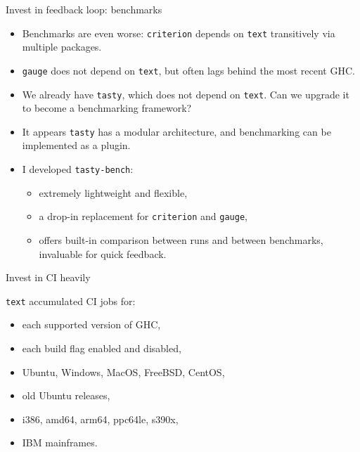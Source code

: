 \documentclass[handout]{beamer}
\begin{document}
\begin{frame}{Invest in feedback loop: benchmarks}

\begin{itemize}[<+->]
\item Benchmarks are even worse: {\tt criterion} depends on {\tt text}
      transitively via multiple packages.
\item {\tt gauge} does not depend on {\tt text}, but often lags behind
      the most recent GHC.
\item We already have {\tt tasty}, which does not depend on {\tt text}.
      Can we upgrade it
      to become a benchmarking framework?
\item It appears {\tt tasty} has a modular architecture,
      and benchmarking can be implemented as a plugin.
\item I developed {\tt tasty-bench}:
  \begin{itemize}
  \item extremely lightweight and flexible,
  \item a drop-in replacement for {\tt criterion} and {\tt gauge},
  \item offers built-in comparison between runs and between
      benchmarks, invaluable for quick feedback.
  \end{itemize}
\end{itemize}

\end{frame}


\begin{frame}{Invest in CI heavily}

{\tt text} accumulated CI jobs for:

\begin{itemize}[<+->]
\item each supported version of GHC,
\item each build flag enabled and disabled,
\item Ubuntu, Windows, MacOS, FreeBSD, CentOS,
\item old Ubuntu releases,
\item i386, amd64, arm64, ppc64le, s390x,
\item IBM mainframes.
\end{itemize}

\end{frame}

\utfchallenges
\end{document}
